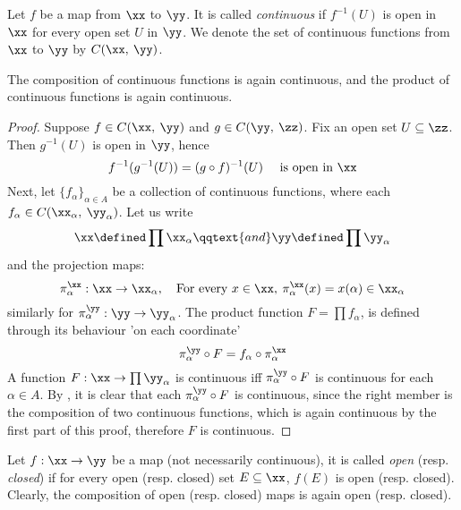 \documentclass[../main-v2-manifolds.tex]{subfiles}
\begin{document}
\begin{definition}\label{chp2:continuity-definition}
    Let $f$ be a map from $\xx$ to $\yy$. It is called \emph{continuous} if $f^{-1}(U)$ is open in $\xx$ for every open set $U$ in $\yy$. We denote the set of continuous functions from $\xx$ to $\yy$ by $C(\xx,\: \yy)$.
\end{definition}

\begin{wts}
    The composition of continuous functions is again continuous, and the product of continuous functions is again continuous.
\end{wts}
\begin{proof}
    Suppose $f\in C(\xx,\: \yy)$ and $g\in C(\yy,\: \zz)$. Fix an open set $U\subseteq\zz$. Then $g^{-1}(U)$ is open in $\yy$, hence 
    \[
        f^{-1}(g^{-1}(U))=(g\circ f)^{-1}(U)\quad\text{ is open in }\xx
    \]
    Next, let $\{f_\alpha\}_{\alpha\in A}$ be a collection of continuous functions, where each $f_\alpha\in C(\xx_\alpha,\: \yy_\alpha)$. Let us write
    \[
        \xx\defined\prod\xx_\alpha\qqtext{and}\yy\defined\prod\yy_\alpha
    \]
    and the projection maps:
    \[
        \pi_\alpha^\xx: \xx\to\xx_\alpha,\quad\text{For every }x\in\xx,\: \pi_\alpha^\xx(x)=x(\alpha)\in \xx_\alpha
    \]
    similarly for $\pi_\alpha^\yy:\yy\to\yy_\alpha$. The product function $F = \prod f_\alpha$, is defined through its behaviour 'on each coordinate'
    \begin{equation}\label{chp2:continuity-product-equation}
        \pi_\alpha^\yy\circ F = f_\alpha\circ \pi_\alpha^\xx
    \end{equation}
    A function $F: \xx\to \prod \yy_\alpha$ is continuous iff $\pi_\alpha^\yy\circ F$ is continuous for each $\alpha\in A$. By , it is clear that each $\pi_\alpha^\yy\circ F$ is continuous, since the right member is the composition of two continuous functions, which is again continuous by the first part of this proof, therefore $F$ is continuous.
\end{proof}
\begin{definition}\label{chp2:open-closed-maps}
    Let $f: \xx\to\yy$ be a map (not necessarily continuous), it is called \emph{open} (resp. \emph{closed}) if for every open (resp. closed) set $E\subseteq\xx$, $f(E)$ is open (resp. closed).\\

    Clearly, the composition of open (resp. closed) maps is again open (resp. closed).
\end{definition}
\end{document}

